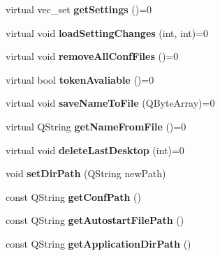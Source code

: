 \begin{DoxyCompactItemize}
$$virtual vec\+\_\+set {\bfseries get\+Settings} ()=0
\item 
\mbox{\label{classIA__CFileManager_a7068b32125fe6accd70733b7ba72efe2}} 
virtual void {\bfseries load\+Setting\+Changes} (int, int)=0
\item 
\mbox{\label{classIA__CFileManager_a214f1b9016c0b5cc75b770f5d8f27b2e}} 
virtual void {\bfseries remove\+All\+Conf\+Files} ()=0
\item 
\mbox{\label{classIA__CFileManager_a1db4c4fd4112696247fcb393f7b4e960}} 
virtual bool {\bfseries token\+Avaliable} ()=0
\item 
\mbox{\label{classIA__CFileManager_a08363df03c2417b7e4956c3eb6ef54ff}} 
virtual void {\bfseries save\+Name\+To\+File} (Q\+Byte\+Array)=0
\item 
\mbox{\label{classIA__CFileManager_ab971a743b574f0a8029d7acf0066cac1}} 
virtual Q\+String {\bfseries get\+Name\+From\+File} ()=0
\item 
\mbox{\label{classIA__CFileManager_ab3110e3b9c0be458e20ae9dc0805add7}} 
virtual void {\bfseries delete\+Last\+Desktop} (int)=0
\item 
\mbox{\label{classIA__CFileManager_a51c05799a3b1bc4dc65b5f4513ef5385}} 
void {\bfseries set\+Dir\+Path} (Q\+String new\+Path)
\item 
\mbox{\label{classIA__CFileManager_a9857a754691f636f2e0cf64ec29a9a61}} 
const Q\+String {\bfseries get\+Conf\+Path} ()
\item 
\mbox{\label{classIA__CFileManager_a7c9413d0e0dbb47f0dcd631f84b5ca8a}} 
const Q\+String {\bfseries get\+Autostart\+File\+Path} ()
\item 
\mbox{\label{classIA__CFileManager_a23b46e90c71f7257b18d021d2bafb157}} 
const Q\+String {\bfseries get\+Application\+Dir\+Path} ()
\end{DoxyCompactItemize}
